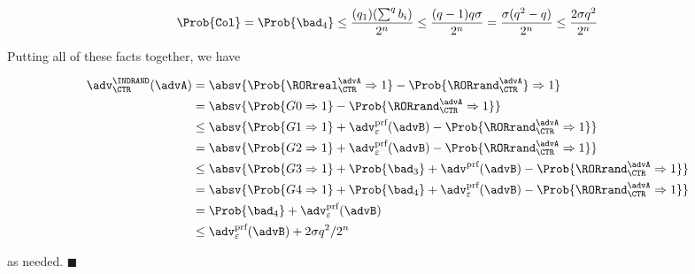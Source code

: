 $$
\Prob{\texttt{Col}} = \Prob{\bad_4} \leq
\frac{(q_1)(\sum^q b_i)}{2^n} \leq
\frac{(q-1) q \sigma}{2^n} =
\frac{\sigma (q^2 -q)}{2^n} \leq
\frac{2 \sigma q^2}{2^n}
$$

Putting all of these facts together, we have

\begin{align*}
  \adv^{\INDRAND}_{\CTR}(\advA)
  &= \absv{\Prob{\RORreal^{\advA}_{\CTR} \Rightarrow 1} - \Prob{\RORrand^{\advA}_{\CTR}} \Rightarrow 1} \\
  &= \absv{\Prob{G0 \Rightarrow 1} - \Prob{\RORrand^{\advA}_{\CTR} \Rightarrow 1}} \\
  &\leq \absv{\Prob{G1 \Rightarrow 1} + \adv^{\textup{prf}}_{\varepsilon}(\advB) - \Prob{\RORrand^{\advA}_{\CTR} \Rightarrow 1}} \\
  &= \absv{\Prob{G2 \Rightarrow 1} + \adv^{\textup{prf}}_{\varepsilon}(\advB) - \Prob{\RORrand^{\advA}_{\CTR} \Rightarrow 1}} \\
  &\leq \absv{\Prob{G3 \Rightarrow 1} + \Prob{\bad_3} + \adv^{\textup{prf}}(\advB) - \Prob{\RORrand^{\advA}_{\CTR} \Rightarrow 1}} \\
  &= \absv{\Prob{G4 \Rightarrow 1} + \Prob{\bad_4} + \adv^{\textup{prf}}_{\varepsilon}(\advB) - \Prob{\RORrand^{\advA}_{\CTR} \Rightarrow 1}} \\
  &= \Prob{\bad_4} + \adv^{\textup{prf}}_{\varepsilon}(\advB) \\
  &\leq \adv^{\textup{prf}}_{\varepsilon}(\advB) + 2 \sigma q^2 / 2^n
\end{align*}

as needed. $\blacksquare$

